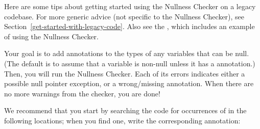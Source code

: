 
Here are some tips about getting started using the Nullness Checker on a
legacy codebase.  For more generic advice (not specific to the Nullness
Checker), see Section~\ref{get-started-with-legacy-code}.  Also see the
, which includes an example of using the Nullness Checker.

Your goal is to add  annotations
to the types of any variables that can be null.  (The default is to assume
that a variable is non-null unless it has a  annotation.)
Then, you will run the Nullness Checker.  Each of its errors indicates
either a possible null pointer exception, or a wrong/missing annotation.
When there are no more warnings from the checker, you are done!

We recommend that you start by searching the code for occurrences of
 in the following locations; when you find one, write the
corresponding annotation:

